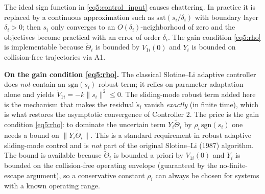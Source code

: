 \begin{remark}
The ideal sign function in \eqref{eq5:control_input} causes chattering. In practice it is
replaced by a continuous approximation such as $\mathrm{sat}(s_i/\delta_i)$ with boundary
layer $\delta_i>0$; then $s_i$ only converges to an $O(\delta_i)$-neighborhood of zero and
the objectives become practical with an error of order $\delta_i$. The gain condition
\eqref{eq5:rho} is implementable because $\tilde{\Theta}_i$ is bounded by
$V_{1i}(0)$ and $Y_i$ is bounded on collision-free trajectories via A1.
\end{remark}

\begin{remark}
\textbf{On the gain condition \eqref{eq5:rho}.}
The classical Slotine--Li adaptive controller \cite{slotineAdaptiveControlRobot1987} does
\emph{not} contain an $\mathrm{sgn}(s_i)$ robust term; it relies on parameter adaptation
alone and yields $\dot{V}_{1i} = -k\|s_i\|^2 \le 0$. The sliding-mode robust term added
here is the mechanism that makes the residual $\dot{s}_i$ vanish \emph{exactly} (in finite
time), which is what restores the asymptotic convergence of Controller 2. The price is
the gain condition \eqref{eq5:rho}: to dominate the uncertain term $Y_i\tilde{\Theta}_i$ by
$\rho_i\,\mathrm{sgn}(s_i)$ one needs a bound on $\|Y_i\tilde{\Theta}_i\|$. This is a
standard requirement in robust adaptive sliding-mode control
\cite{slotineLiAppliedNonlinearControl1991,ioannouSunRobustAdaptiveControl1996} and is
\emph{not} part of the original Slotine--Li (1987) algorithm. The bound is available
because $\tilde{\Theta}_i$ is bounded a priori by $V_{1i}(0)$ and $Y_i$ is bounded on the
collision-free operating envelope (guaranteed by the no-finite-escape argument), so a
conservative constant $\rho_i$ can always be chosen for systems with a known operating
range.
\end{remark}
